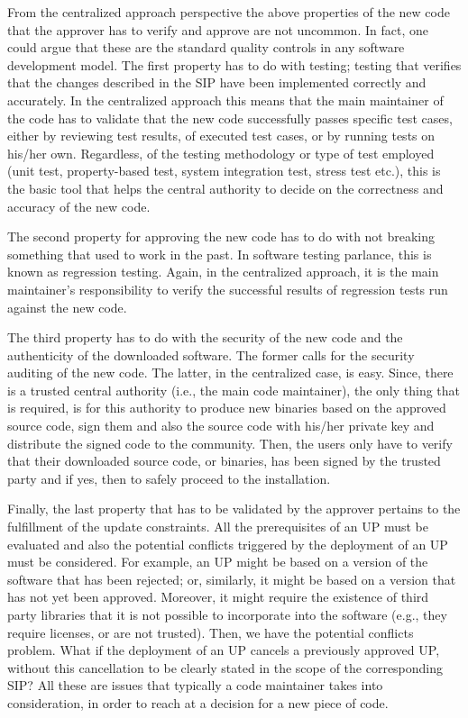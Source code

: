 From the centralized approach perspective the above properties of the new code that the approver has to verify and approve are not uncommon. In fact, one could argue that these are the standard quality controls in any software development model. The first property has to do with testing; testing that verifies that the changes described in the SIP have been implemented correctly and accurately. In the centralized approach this means that the main maintainer of the code has to validate that the new code successfully passes specific test cases, either by reviewing test results, of executed test cases, or by running tests on his/her own. Regardless, of the testing methodology or type of test employed (unit test, property-based test, system integration test, stress test etc.), this is the basic tool that helps the central authority to decide on the correctness and accuracy of the new code. 

The second property for approving the new code has to do with not breaking something that used to work in the past. In software testing parlance, this is known as regression testing. Again, in the centralized approach, it is the main maintainer's responsibility to verify the successful results of regression tests run against the new code. 

The third property has to do with the security of the new code and the authenticity of the downloaded software. The former calls for the security auditing of the new code. The latter, in the centralized case, is easy. Since, there is a trusted central authority (i.e., the main code maintainer), the only thing that is required, is for this authority to produce new binaries based on the approved source code, sign them and also the source code with his/her private key and distribute the signed code to the community. Then, the users only have to verify that their downloaded source code, or binaries, has been signed by the trusted party and if yes, then to safely proceed to the installation.

Finally, the last property that has to be validated by the approver pertains to the fulfillment of the update constraints. All the prerequisites of an UP must be evaluated and also the potential conflicts triggered by the deployment of an UP must be considered. For example, an UP might be based on a version of the software that has been rejected; or, similarly, it might be based on a version that has not yet been approved. Moreover, it might require the existence of third party libraries that it is not possible to incorporate into the software (e.g., they require licenses, or are not trusted). Then, we have the potential conflicts problem. What if the deployment of an UP cancels a previously approved UP, without this cancellation to be clearly stated in the scope of the corresponding SIP? All these are issues that typically a code maintainer takes into consideration, in order to reach at a decision for a new piece of code.

